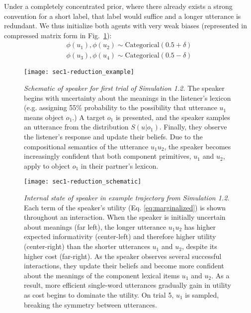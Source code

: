 Under a completely concentrated prior, where there already exists a strong convention for a short label, that label would suffice and a longer utterance is redundant.
We thus initialize both agents with very weak biases (represented in compressed matrix form in Fig.~\ref{fig:sec1efficiency}):
\begin{align}
\phi(u_1), \phi(u_2) \sim \textrm{Categorical}(0.5 + \delta) \nonumber\\
\phi(u_3), \phi(u_4) \sim \textrm{Categorical}(0.5 - \delta) \nonumber
\end{align}

\begin{figure}
\centering
    \texttt{[image: sec1-reduction\_example]}
    \vspace{1em}
  \caption{\emph{Schematic of speaker for first trial of Simulation 1.2.} The speaker begins with uncertainty about the meanings in the listener's lexicon (e.g. assigning 55\% probability to the possibility that utterance $u_1$ means object $o_1$.) A target $o_1$ is presented, and the speaker samples an utterance from the distribution $S(u|o_1)$. Finally, they observe the listener's response and update their beliefs. Due to the compositional semantics of the utterance $u_1u_2$, the speaker becomes increasingly confident that both component primitives, $u_1$ and $u_2$, apply to object $o_1$ in their partner's lexicon.}
  \label{fig:sec1efficiency}
\end{figure}



\begin{figure*}[t]
\centering
    \texttt{[image: sec1-reduction\_schematic]}
    \vspace{1em}
  \caption{\emph{Internal state of speaker in example trajectory from Simulation 1.2.} Each term of the speaker's utility (Eq. \ref{eq:marginalized}) is shown throughout an interaction. When the speaker is initially uncertain about meanings (far left), the longer utterance $u_1u_2$ has higher expected informativity (center-left) and therefore higher utility (center-right) than the shorter utterances $u_1$ and $u_2$, despite its higher cost (far-right). As the speaker observes several successful interactions, they update their beliefs and become more confident about the meanings of the component lexical items $u_1$ and $u_2$. As a result, more efficient single-word utterances gradually gain in utility as cost begins to dominate the utility. On trial 5, $u_1$ is sampled, breaking the symmetry between utterances.}
  \label{fig:sec1internals}
\end{figure*}

